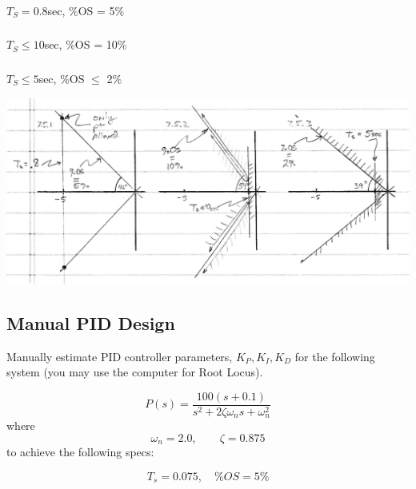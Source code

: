 \documentclass{article}	%
\begin{document}
\subsubsection{}    $T_S = 0.8$sec, \%OS = 5\%

\subsubsection{}    $T_S \leq 10$sec, \%OS = 10\%

\subsubsection{}    $T_S \leq 5$sec, \%OS $\leq$ 2\%


\begin{solution}

\includegraphics[width=6.5in]{01121.png}

\end{solution}





\subsection{Manual PID Design}\label{manualdesign1}


Manually estimate PID controller parameters, $K_P, K_I, K_D$ for the following system (you may use the computer for Root Locus).

\[
P(s) = \frac  {100(s+0.1)}   {s^2+2\zeta\omega_ns + \omega_n^2}
\]
where
\[
\omega_n = 2.0, \qquad \zeta = 0.875
\]
to achieve the following specs:

\[
T_s = 0.075, \quad \%OS = 5\%
\]
\end{document}
